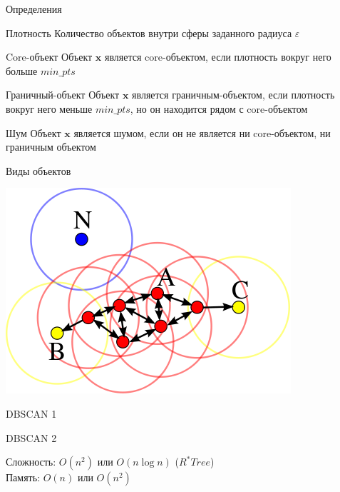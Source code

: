 \documentclass[10pt]{beamer}
\begin{document}
\begin{frame}{Определения}

\begin{block}{Плотность}
Количество объектов внутри сферы заданного радиуса $\varepsilon$
\end{block}

\begin{block}{Core-объект}
Объект $\mathbf{x}$ является core-объектом, если плотность вокруг него больше $min\_pts$
\end{block}

\begin{block}{Граничный-объект}
Объект $\mathbf{x}$ является граничным-объектом, если плотность вокруг него меньше $min\_pts$, но он находится рядом с core-объектом
\end{block}

\begin{block}{Шум}
Объект $\mathbf{x}$ является шумом, если он не является ни core-объектом, ни граничным объектом
\end{block}

\end{frame}

\begin{frame}{Виды объектов}

\begin{center}
\includegraphics[scale=0.5]{images/points.png}
\end{center}

\end{frame}

\begin{frame}{DBSCAN 1}

\dbscan

\end{frame}

\begin{frame}{DBSCAN 2}

\extc

Сложность: $O(n^2)$ или $O(n \log n)$ ($R^*Tree$) \\ 
Память: $O(n)$ или $O(n^2)$ 

\end{frame}
\end{document}

